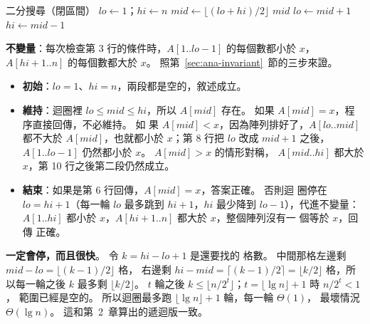 \begin{pseudo}[label=alg:dc-bsearch]{二分搜尋（閉區間）}
    \State $\mathit{lo} \gets 1$；$\mathit{hi} \gets n$
        \State $\mathit{mid} \gets \lfloor (\mathit{lo} + \mathit{hi}) / 2 \rfloor$
            \State \Return $\mathit{mid}$
            \State $\mathit{lo} \gets \mathit{mid} + 1$
        \Else
            \State $\mathit{hi} \gets \mathit{mid} - 1$
        \EndIf
    \EndWhile
    \State \Return \NIL
\EndFunction
\end{pseudo}

\textbf{不變量}：每次檢查第 3 行的條件時，$A[1..\mathit{lo}-1]$ 的每個數都小於
$x$，$A[\mathit{hi}+1..n]$ 的每個數都大於 $x$。 照第~\ref{sec:ana-invariant}~節的三步來證。

\begin{itemize}
\item \textbf{初始}：$\mathit{lo} = 1$、$\mathit{hi} = n$，兩段都是空的，敘述成立。
\item \textbf{維持}：迴圈裡 $\mathit{lo} \le \mathit{mid} \le \mathit{hi}$，所以
$A[\mathit{mid}]$ 存在。 如果 $A[\mathit{mid}] = x$，程序直接回傳，不必維持。 如
果 $A[\mathit{mid}] < x$，因為陣列排好了，$A[\mathit{lo}..\mathit{mid}]$ 都不大於
$A[\mathit{mid}]$，也就都小於 $x$；第 8 行把 $\mathit{lo}$ 改成 $\mathit{mid} +
1$ 之後，$A[1..\mathit{lo}-1]$ 仍然都小於 $x$。 $A[\mathit{mid}] > x$ 的情形對稱，
$A[\mathit{mid}..\mathit{hi}]$ 都大於 $x$，第 10 行之後第二段仍然成立。
\item \textbf{結束}：如果是第 6 行回傳，$A[\mathit{mid}] = x$，答案正確。 否則迴
圈停在 $\mathit{lo} = \mathit{hi} + 1$（每一輪 $\mathit{lo}$ 最多跳到
$\mathit{hi} + 1$，$\mathit{hi}$ 最少降到 $\mathit{lo} - 1$），代進不變量：
$A[1..\mathit{hi}]$ 都小於 $x$，$A[\mathit{hi}+1..n]$ 都大於 $x$，整個陣列沒有一
個等於 $x$，回傳 \NIL{} 正確。
\end{itemize}

\textbf{一定會停，而且很快}。 令 $k = \mathit{hi} - \mathit{lo} + 1$ 是還要找的
格數。 中間那格左邊剩 $\mathit{mid} - \mathit{lo} = \lfloor (k-1)/2 \rfloor$ 格，
右邊剩 $\mathit{hi} - \mathit{mid} = \lceil (k-1)/2 \rceil = \lfloor k/2 \rfloor$
格，所以每一輪之後 $k$ 最多剩 $\lfloor k/2 \rfloor$。 $t$ 輪之後
$k \le \lfloor n / 2^t \rfloor$；$t = \lfloor \lg n \rfloor + 1$ 時 $n / 2^t < 1$，
範圍已經是空的。 所以迴圈最多跑 $\lfloor \lg n \rfloor + 1$ 輪，每一輪 $\Theta(1)$，
最壞情況 $\Theta(\lg n)$。 這和第~2~章算出的遞迴版一致。

